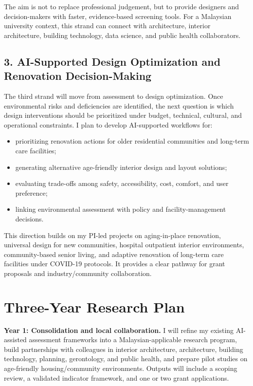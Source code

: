 \documentclass[11pt,a4paper]{article}
\begin{document}
The aim is not to replace professional judgement, but to provide designers and decision-makers with faster, evidence-based screening tools. For a Malaysian university context, this strand can connect with architecture, interior architecture, building technology, data science, and public health collaborators.

\subsection*{3. AI-Supported Design Optimization and Renovation Decision-Making}
The third strand will move from assessment to design optimization. Once environmental risks and deficiencies are identified, the next question is which design interventions should be prioritized under budget, technical, cultural, and operational constraints. I plan to develop AI-supported workflows for:
\begin{itemize}
  \item prioritizing renovation actions for older residential communities and long-term care facilities;
  \item generating alternative age-friendly interior design and layout solutions;
  \item evaluating trade-offs among safety, accessibility, cost, comfort, and user preference;
  \item linking environmental assessment with policy and facility-management decisions.
\end{itemize}

This direction builds on my PI-led projects on aging-in-place renovation, universal design for new communities, hospital outpatient interior environments, community-based senior living, and adaptive renovation of long-term care facilities under COVID-19 protocols. It provides a clear pathway for grant proposals and industry/community collaboration.

\section*{Three-Year Research Plan}
\textbf{Year 1: Consolidation and local collaboration.} I will refine my existing AI-assisted assessment frameworks into a Malaysian-applicable research program, build partnerships with colleagues in interior architecture, architecture, building technology, planning, gerontology, and public health, and prepare pilot studies on age-friendly housing/community environments. Outputs will include a scoping review, a validated indicator framework, and one or two grant applications.
\end{document}
